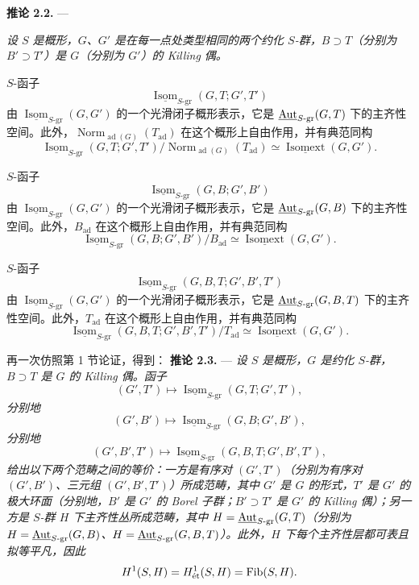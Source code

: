 \medskip\noindent\textbf{推论 2.2.} ---
{\itshape 设 \(S\) 是概形，\(G\)、\(G'\) 是在每一点处类型相同的两个约化 \(S\)-群，\(B\supset T\)（分别为 \(B'\supset T'\)）是 \(G\)（分别为 \(G'\)）的 Killing 偶。

\textup{} \(S\)-函子
\[
  \underline{\operatorname{Isom}}_{S\text{-}\mathrm{gr}}
    (G,T;G',T')
\]
由 \(\underline{\operatorname{Isom}}_{S\text{-}\mathrm{gr}}(G,G')\) 的一个光滑闭子概形表示，它是 \(\underline{\operatorname{Aut}}_{S\text{-}\mathrm{gr}}(G,T)\) 下的主齐性空间。此外，\(\operatorname{Norm}_{\operatorname{ad}(G)}(T_{\mathrm{ad}})\) 在这个概形上自由作用，并有典范同构
\[
  \underline{\operatorname{Isom}}_{S\text{-}\mathrm{gr}}
    (G,T;G',T')
  \big/
  \operatorname{Norm}_{\operatorname{ad}(G)}(T_{\mathrm{ad}})
  \simeq
  \underline{\operatorname{Isomext}}(G,G').
\]

\textup{} \(S\)-函子
\[
  \underline{\operatorname{Isom}}_{S\text{-}\mathrm{gr}}
    (G,B;G',B')
\]
由 \(\underline{\operatorname{Isom}}_{S\text{-}\mathrm{gr}}(G,G')\) 的一个光滑闭子概形表示，它是 \(\underline{\operatorname{Aut}}_{S\text{-}\mathrm{gr}}(G,B)\) 下的主齐性空间。此外，\(B_{\mathrm{ad}}\) 在这个概形上自由作用，并有典范同构
\[
  \underline{\operatorname{Isom}}_{S\text{-}\mathrm{gr}}
    (G,B;G',B')
  \big/B_{\mathrm{ad}}
  \simeq
  \underline{\operatorname{Isomext}}(G,G').
\]

\textup{} \(S\)-函子
\[
  \underline{\operatorname{Isom}}_{S\text{-}\mathrm{gr}}
    (G,B,T;G',B',T')
\]
由 \(\underline{\operatorname{Isom}}_{S\text{-}\mathrm{gr}}(G,G')\) 的一个光滑闭子概形表示，它是 \(\underline{\operatorname{Aut}}_{S\text{-}\mathrm{gr}}(G,B,T)\) 下的主齐性空间。此外，\(T_{\mathrm{ad}}\) 在这个概形上自由作用，并有典范同构
\[
  \underline{\operatorname{Isom}}_{S\text{-}\mathrm{gr}}
    (G,B,T;G',B',T')
  \big/T_{\mathrm{ad}}
  \simeq
  \underline{\operatorname{Isomext}}(G,G').
\]}

再一次仿照第 1 节论证，得到：
\medskip\noindent\textbf{推论 2.3.} ---
{\itshape 设 \(S\) 是概形，\(G\) 是约化 \(S\)-群，\(B\supset T\) 是 \(G\) 的 Killing 偶。函子}
\[
  (G',T')
  \longmapsto
  \underline{\operatorname{Isom}}_{S\text{-}\mathrm{gr}}
    (G,T;G',T'),
\]
{\itshape 分别地}
\[
  (G',B')
  \longmapsto
  \underline{\operatorname{Isom}}_{S\text{-}\mathrm{gr}}
    (G,B;G',B'),
\]
{\itshape 分别地}
\[
  (G',B',T')
  \longmapsto
  \underline{\operatorname{Isom}}_{S\text{-}\mathrm{gr}}
    (G,B,T;G',B',T'),
\]
{\itshape 给出以下两个范畴之间的等价：一方是有序对 \((G',T')\)（分别为有序对 \((G',B')\)、三元组 \((G',B',T')\)）所成范畴，其中 \(G'\) 是 \(G\) 的形式，\(T'\) 是 \(G'\) 的极大环面（分别地，\(B'\) 是 \(G'\) 的 Borel 子群；\(B'\supset T'\) 是 \(G'\) 的 Killing 偶）；另一方是 \(S\)-群 \(H\) 下主齐性丛所成范畴，其中 \(H=\underline{\operatorname{Aut}}_{S\text{-}\mathrm{gr}}(G,T)\)（分别为 \(H=\underline{\operatorname{Aut}}_{S\text{-}\mathrm{gr}}(G,B)\)、\(H=\underline{\operatorname{Aut}}_{S\text{-}\mathrm{gr}}(G,B,T)\)）。此外，\(H\) 下每个主齐性层都可表且拟等平凡，因此}
\[
  H^1(S,H)=H^1_{\mathrm{\acute et}}(S,H)=\operatorname{Fib}(S,H).
\]

